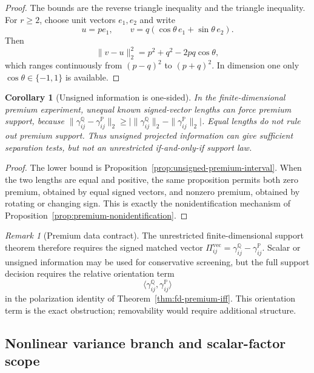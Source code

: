 \documentclass[11pt,a4paper]{amsart}
\theoremstyle{plain}
\newtheorem{corollary}[theorem]{Corollary}
\theoremstyle{definition}
\theoremstyle{remark}
\newtheorem{remark}[theorem]{Remark}
\newcommand{\PP}{\mathbb{P}}
\newcommand{\QQ}{\mathbb{Q}}
\begin{document}
\begin{proof}
The bounds are the reverse triangle inequality and the triangle inequality.  For \(r\ge2\), choose
unit vectors \(e_1,e_2\) and write
\[
        u=pe_1,
        \qquad
        v=q(\cos\theta\,e_1+\sin\theta\,e_2).
\]
Then
\[
        \|v-u\|_2^2=p^2+q^2-2pq\cos\theta,
\]
which ranges continuously from \((p-q)^2\) to \((p+q)^2\).  In dimension one only
\(\cos\theta\in\{-1,1\}\) is available.
\end{proof}

\begin{corollary}[Unsigned information is one-sided]
\label{cor:unsigned-one-sided-premium}
In the finite-dimensional premium experiment, unequal known signed-vector lengths can force
premium support, because \(\|\gamma_{ij}^\QQ-\gamma_{ij}^\PP\|_2\ge
\bigl|\|\gamma_{ij}^\QQ\|_2-\|\gamma_{ij}^\PP\|_2\bigr|\).  Equal lengths do not rule out premium
support.  Thus unsigned projected information can give sufficient separation tests, but not an
unrestricted if-and-only-if support law.
\end{corollary}

\begin{proof}
The lower bound is Proposition~\ref{prop:unsigned-premium-interval}.  When the two lengths are
equal and positive, the same proposition permits both zero premium, obtained by equal signed
vectors, and nonzero premium, obtained by rotating or changing sign.  This is exactly the
nonidentification mechanism of Proposition~\ref{prop:premium-nonidentification}.
\end{proof}

\begin{remark}[Premium data contract]
\label{rem:premium-data-contract-developed}
The unrestricted finite-dimensional support theorem therefore requires the signed matched vector
\(\Pi_{ij}^{\mathrm{vec}}=\gamma_{ij}^\QQ-\gamma_{ij}^\PP\).  Scalar or unsigned information may
be used for conservative screening, but the full support decision requires the relative
orientation term
\[
        \langle\gamma_{ij}^\QQ,\gamma_{ij}^\PP\rangle
\]
in the polarization identity of Theorem~\ref{thm:fd-premium-iff}.  This orientation term is the
exact obstruction; removability would require additional structure.
\end{remark}

\subsection{Nonlinear variance branch and scalar-factor scope}
\label{subsec:variance-hierarchy-scope}
\end{document}
